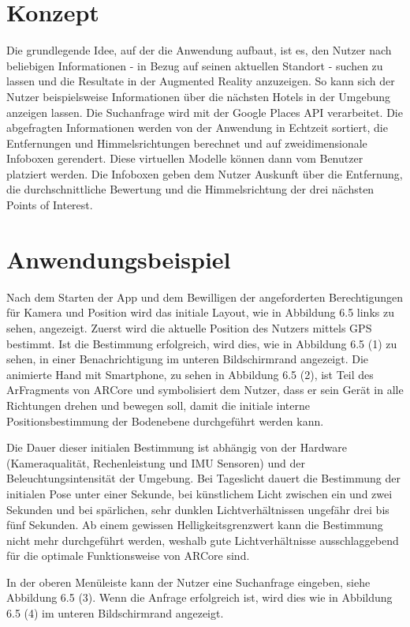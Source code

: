 \section{Konzept}

Die grundlegende Idee, auf der die Anwendung aufbaut, ist es, den Nutzer nach beliebigen Informationen - in Bezug auf seinen aktuellen Standort - suchen zu lassen und die Resultate in der Augmented Reality anzuzeigen. So kann sich der Nutzer beispielsweise Informationen über die nächsten Hotels in der Umgebung anzeigen lassen. Die Suchanfrage wird mit der Google Places API verarbeitet. Die abgefragten Informationen werden von der Anwendung in Echtzeit sortiert, die Entfernungen und Himmelsrichtungen berechnet und auf zweidimensionale Infoboxen gerendert. Diese virtuellen Modelle können dann vom Benutzer platziert werden. Die Infoboxen geben dem Nutzer Auskunft über die Entfernung, die durchschnittliche Bewertung und die Himmelsrichtung der drei nächsten Points of Interest.

\section{Anwendungsbeispiel}

Nach dem Starten der App und dem Bewilligen der angeforderten Berechtigungen für Kamera und Position wird das initiale Layout, wie in Abbildung 6.5 links zu sehen, angezeigt. Zuerst wird die aktuelle Position des Nutzers mittels GPS bestimmt. Ist die Bestimmung erfolgreich, wird dies, wie in Abbildung 6.5 (1) zu sehen, in einer Benachrichtigung im unteren Bildschirmrand angezeigt. Die animierte Hand mit Smartphone, zu sehen in Abbildung 6.5 (2), ist Teil des ArFragments von ARCore und symbolisiert dem Nutzer, dass er sein Gerät in alle Richtungen drehen und bewegen soll, damit die initiale interne Positionsbestimmung der Bodenebene durchgeführt werden kann. 

Die Dauer dieser initialen Bestimmung ist abhängig von der Hardware (Kameraqualität, Rechenleistung und IMU Sensoren) und der Beleuchtungsintensität der Umgebung. Bei Tageslicht dauert die Bestimmung der initialen Pose unter einer Sekunde, bei künstlichem Licht zwischen ein und zwei Sekunden und bei spärlichen, sehr dunklen Lichtverhältnissen ungefähr drei bis fünf Sekunden. Ab einem gewissen Helligkeitsgrenzwert kann die Bestimmung nicht mehr durchgeführt werden, weshalb gute Lichtverhältnisse ausschlaggebend für die optimale Funktionsweise von ARCore sind.

In der oberen Menüleiste kann der Nutzer eine Suchanfrage eingeben, siehe Abbildung 6.5 (3). Wenn die Anfrage erfolgreich ist, wird dies wie in Abbildung 6.5 (4) im unteren Bildschirmrand angezeigt. 

